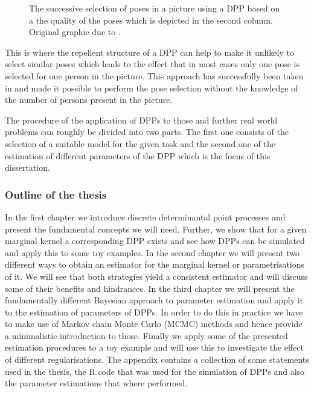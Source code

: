 \begin{enumerate}
\begin{figure}[h!]
	\caption{The successive selection of poses in a picture using a DPP based on a the quality of the poses which is depicted in the second column. Original graphic due to \cite{kulesza2010structured}.}
	\label{fig:1}
\end{figure}
 This is where the repellent structure of a DPP can help to make it unlikely to select similar poses which leads to the effect that in most cases only one pose is selected for one person in the picture. This approach has successfully been taken in \cite{kulesza2010structured} and made it possible to perform the pose selection without the knowledge of the number of persons present in the picture.
\end{enumerate}

The procedure of the application of DPPs to those and further real world problems can roughly be divided into two parts. The first one consists of the selection of a suitable model for the given task and the second one of the estimation of different parameters of the DPP which is the focus of this dissertation. 

\subsubsection{Outline of the thesis}
In the first chapter we introduce discrete determinantal point processes and present the fundamental concepts we will need. Further, we show that for a given marginal kernel a corresponding DPP exists and see how DPPs can be simulated and apply this to some toy examples. In the second chapter we will present two different ways to obtain an estimator for the marginal kernel or parametrisations of it. We will see that both strategies yield a consistent estimator and will discuss some of their benefits and hindrances. In the third chapter we will present the fundamentally different Bayesian approach to parameter estimation and apply it to the estimation of parameters of DPPs. In order to do this in practice we have to make use of Markov chain Monte Carlo (MCMC) methods and hence provide a minimalistic introduction to those. Finally we apply some of the presented estimation procedures to a toy example and will use this to investigate the effect of different regularisations. 
The appendix contains a collection of some statements used in the thesis, the R code that was used for the simulation of DPPs and also the parameter estimations that where performed.

